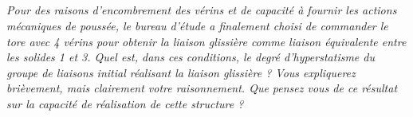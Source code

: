 \documentclass[10pt,fleqn]{article} %
\begin{document}
\begin{multicols}{2}
\subparagraph{}\textit{Pour des raisons d'encombrement des vérins et de capacité à fournir les actions mécaniques de poussée, le
bureau d'étude a finalement choisi de commander le tore avec 4 vérins pour obtenir la liaison glissière
comme liaison équivalente entre les solides 1 et 3. Quel est, dans ces conditions, le degré d'hyperstatisme du
groupe de liaisons initial réalisant la liaison glissière ? Vous expliquerez brièvement, mais clairement votre
raisonnement. Que pensez vous de ce résultat sur la capacité de réalisation de cette structure ?}
\ifprof
\begin{corrige}~\\
\end{corrige}
\else
\fi

\ifprof
\else
\end{multicols}
\fi

\end{document}
